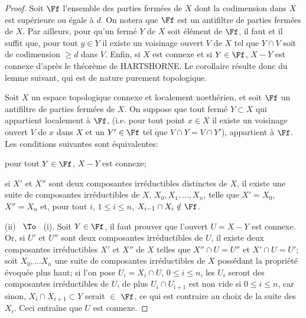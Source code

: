 \begin{proof}
Soit $\Ff$ l'ensemble des parties ferm\'ees de $X$ dont la codimension dans $X$ est sup\'erieure ou \'egale \`a $d$. On notera que $\Ff$ est un antifiltre de parties ferm\'ees de $X$. Par ailleurs, pour qu'un ferm\'e $Y$ de $X$ soit \'el\'ement de $\Ff$, il faut et il suffit que, pour tout $y\in Y$ il existe un voisinage ouvert $V$ de $X$ tel que $Y\cap V$ soit de codimension $\geq d$ dans $V$. Enfin, si $X$ est connexe et si $Y\in \Ff$, $X-Y$ est connexe d'apr\`es le th\'eor\`eme de HARTSHORNE. Le corollaire r\'esulte donc du lemme suivant, qui est de nature purement topologique.

\begin{lemme} \label{III.3.8}
Soit $X$ un espace topologique connexe et localement noeth\'erien, et soit $\Ff$ un antifiltre de parties ferm\'ees de $X$. On suppose que tout ferm\'e $Y\subset X$ qui appartient localement \`a $\Ff$, (i.e. pour tout point $x\in X$ il existe un voisinage ouvert $V$ de $x$ dans $X$ et un $Y'\in \Ff$ tel que $V\cap Y=V\cap Y'$), appartient \`a $\Ff$. Les conditions suivantes sont \'equivalentes:
\begin{enumeratei}

\item
pour tout $Y\in \Ff$, $X-Y$ est connexe;

\item
si $X'$ et $X''$ sont deux composantes irr\'eductibles distinctes de $X$, il existe une suite de composantes irr\'eductibles de $X$, $X_0, X_1, \ldots, X_n$, telle que $X'=X_0$, $X''=X_n$ et, pour tout $i$, $1\leq i\leq n$, $X_{i-1} \cap X_i \notin \Ff$.
\end{enumeratei}
\end{lemme}

(ii) ~$\To$~ (i). Soit $Y\in \Ff$, il faut prouver que l'ouvert $U=X-Y$ est connexe. Or, si $U'$ et $U''$ sont deux composantes irr\'eductibles de $U$, il existe deux composantes irr\'eductibles $X'$ et $X''$ de $X$ telles que $X''\cap U=U''$ et $X'\cap U=U'$; soit $X_0, \ldots X_n$ une suite de composantes irr\'eductibles de $X$ poss\'edant la propri\'et\'e \'evoqu\'ee plus haut; si l'on pose $U_i=X_i\cap U$, $0\leq i\leq n$, les $U_i$ seront des composantes irr\'eductibles de $U$, de plus $U_{i}\cap U_{i+1}$ est non vide si $0\leq i\leq n$, car sinon, {$X_{i}\cap X_{i+1} \subset Y$} serait $\in$ $\Ff$, ce qui est contraire au choix de la suite des $X_i$. Ceci entra\^ine que $U$ est connexe.


\end{proof}
